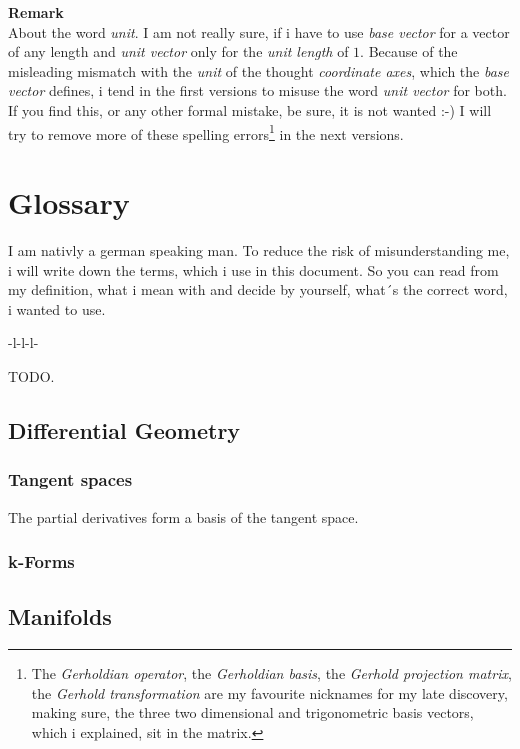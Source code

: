 \documentclass[a4paper]{article}
\begin{document}
\textbf{Remark}\\
About the word \emph{unit}. I am not really sure, if i have to use \emph{base vector} for a vector of any length and \emph{unit vector} only for the \emph{unit length} of $1$. Because of the misleading mismatch with the \emph{unit} of the thought \emph{coordinate axes}, which the \emph{base vector} defines, i tend in the first versions to misuse the word \emph{unit vector} for both. If you find this, or any other formal mistake, be sure, it is not wanted :-) I will try to remove more of these spelling errors\footnote{The \emph{Gerholdian operator}, the \emph{Gerholdian basis}, the \emph{Gerhold projection matrix}, the \emph{Gerhold transformation} are my favourite nicknames for my late discovery, making sure, the three two dimensional and trigonometric basis vectors, which i explained, sit in the matrix.} in the next versions.
\section{Glossary}

I am nativly a german speaking man. To reduce the risk of misunderstanding me, i will write down the terms, which i use in this document. So you can read from my definition, what i mean with and decide by yourself, what´s the correct word, i wanted to use.\\


\begin{tabular}{-l-l-l-}

\end{tabular}

TODO.


\subsection{Differential Geometry}

\subsubsection{Tangent spaces}

The partial derivatives form a basis of the tangent space.

\subsubsection{k-Forms}

\subsection{Manifolds}
\end{document}
